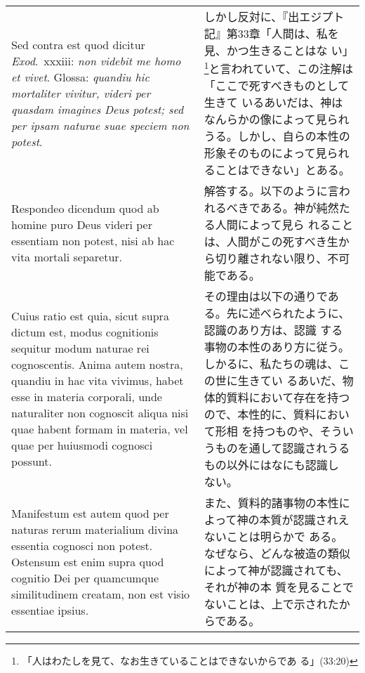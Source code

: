 \documentclass[10pt]{jsarticle} %
\begin{document}
\begin{longtable}{p{21em}p{21em}}
\\

{\sc Sed contra est} quod dicitur {\it Exod}.~{\sc xxxiii}: {\it non
videbit me homo et vivet}. Glossa: {\it quandiu hic mortaliter
vivitur, videri per quasdam imagines Deus potest; sed per ipsam
naturae suae speciem non potest}.

&

しかし反対に、『出エジプト記』第33章「人間は、私を見、かつ生きることはな
い」\footnote{「人はわたしを見て、なお生きていることはできないからであ
る」(33:20)}と言われていて、この注解は「ここで死すべきものとして生きて
いるあいだは、神はなんらかの像によって見られうる。しかし、自らの本性の
形象そのものによって見られることはできない」とある。

\\

{\sc Respondeo dicendum} quod ab homine puro Deus videri per essentiam
non potest, nisi ab hac vita mortali separetur. 

&

解答する。以下のように言われるべきである。神が純然たる人間によって見ら
れることは、人間がこの死すべき生から切り離されない限り、不可能である。

\\

Cuius ratio est quia, sicut supra dictum est, modus cognitionis
sequitur modum naturae rei cognoscentis.  Anima autem nostra, quandiu
in hac vita vivimus, habet esse in materia corporali, unde naturaliter
non cognoscit aliqua nisi quae habent formam in materia, vel quae per
huiusmodi cognosci possunt.

&

その理由は以下の通りである。先に述べられたように、認識のあり方は、認識
する事物の本性のあり方に従う。しかるに、私たちの魂は、この世に生きてい
るあいだ、物体的質料において存在を持つので、本性的に、質料において形相
を持つものや、そういうものを通して認識されうるもの以外にはなにも認識し
ない。

\\

Manifestum est autem quod per naturas rerum materialium divina
essentia cognosci non potest. Ostensum est enim supra quod cognitio
Dei per quamcumque similitudinem creatam, non est visio essentiae
ipsius.

&

また、質料的諸事物の本性によって神の本質が認識されえないことは明らかで
ある。なぜなら、どんな被造の類似によって神が認識されても、それが神の本
質を見ることでないことは、上で示されたからである。


\end{longtable}
\end{document}
